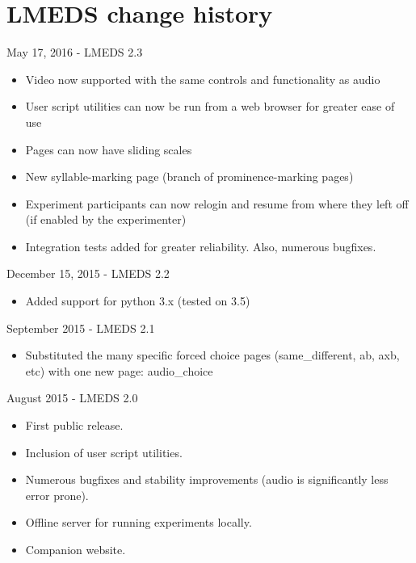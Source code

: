 
\section{LMEDS change history}

May 17, 2016 - LMEDS 2.3

\begin{itemize}
\item Video now supported with the same controls and functionality as audio
\item User script utilities can now be run from a web browser for greater ease of use
\item Pages can now have sliding scales
\item New syllable-marking page (branch of prominence-marking pages)
\item Experiment participants can now relogin and resume from where they left off (if enabled by the experimenter)
\item Integration tests added for greater reliability.  Also, numerous bugfixes.
\end{itemize}

December 15, 2015 - LMEDS 2.2

\begin{itemize}
\item Added support for python 3.x (tested on 3.5)
\end{itemize}

September 2015 - LMEDS 2.1

\begin{itemize}
\item Substituted the many specific forced choice pages (same\_different, ab, axb, etc) with one new page: audio\_choice
\end{itemize}

August 2015 - LMEDS 2.0

\begin{itemize}
\item First public release.  
\item Inclusion of user script utilities.
\item Numerous bugfixes and stability improvements (audio is significantly less error prone).  
\item Offline server for running experiments locally.
\item Companion website.
\end{itemize}

